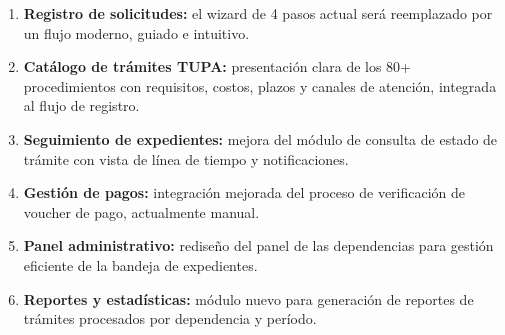 \begin{enumerate}
    \item \textbf{Registro de solicitudes:} el wizard de 4 pasos actual será reemplazado por un flujo moderno, guiado e intuitivo.
    \item \textbf{Catálogo de trámites TUPA:} presentación clara de los 80+ procedimientos con requisitos, costos, plazos y canales de atención, integrada al flujo de registro.
    \item \textbf{Seguimiento de expedientes:} mejora del módulo de consulta de estado de trámite con vista de línea de tiempo y notificaciones.
    \item \textbf{Gestión de pagos:} integración mejorada del proceso de verificación de voucher de pago, actualmente manual.
    \item \textbf{Panel administrativo:} rediseño del panel de las dependencias para gestión eficiente de la bandeja de expedientes.
    \item \textbf{Reportes y estadísticas:} módulo nuevo para generación de reportes de trámites procesados por dependencia y período.
\end{enumerate}